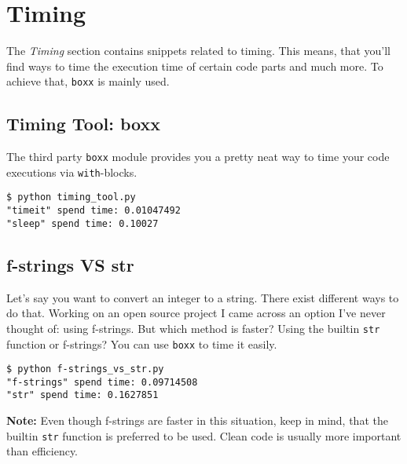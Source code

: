 
\section{Timing}

The \textit{Timing} section contains snippets related to timing.
This means, that you'll find ways to time the execution time of certain code parts and much more.
To achieve that, \lstinline{boxx} is mainly used.


\subsection{Timing Tool: boxx}

The third party \lstinline{boxx} module provides you a pretty neat way to time your code executions via \lstinline{with}-blocks.



\begin{lstlisting}[caption=Output of timing\_tool.py]
$ python timing_tool.py
"timeit" spend time: 0.01047492
"sleep" spend time: 0.10027
\end{lstlisting}


\subsection{f-strings VS str}

Let's say you want to convert an integer to a string.
There exist different ways to do that.
Working on an open source project I came across an option I've never thought of: using f-strings.
But which method is faster?
Using the builtin \lstinline{str} function or f-strings?
You can use \lstinline{boxx} to time it easily.



\begin{lstlisting}[caption=Output of f-strings\_vs\_str.py]
$ python f-strings_vs_str.py
"f-strings" spend time: 0.09714508
"str" spend time: 0.1627851
\end{lstlisting}

\textbf{Note:} Even though f-strings are faster in this situation, keep in mind, that the builtin \lstinline{str} function is preferred to be used.
Clean code is usually more important than efficiency.


